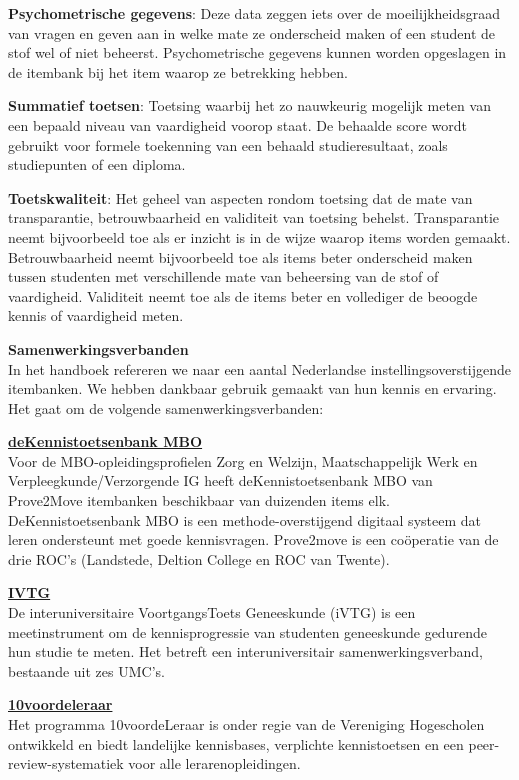 \documentclass[
]{book}
\begin{document}
\textbf{Psychometrische gegevens}: Deze data zeggen iets over de moeilijkheidsgraad van vragen en geven aan in welke mate ze onderscheid maken of een student de stof wel of niet beheerst. Psychometrische gegevens kunnen worden opgeslagen in de itembank bij het item waarop ze betrekking hebben.

\textbf{Summatief toetsen}: Toetsing waarbij het zo nauwkeurig mogelijk meten van een bepaald niveau van vaardigheid voorop staat. De behaalde score wordt gebruikt voor formele toekenning van een behaald studieresultaat, zoals studiepunten of een diploma.

\textbf{Toetskwaliteit}: Het geheel van aspecten rondom toetsing dat de mate van transparantie, betrouwbaarheid en validiteit van toetsing behelst. Transparantie neemt bijvoorbeeld toe als er inzicht is in de wijze waarop items worden gemaakt. Betrouwbaarheid neemt bijvoorbeeld toe als items beter onderscheid maken tussen studenten met verschillende mate van beheersing van de stof of vaardigheid. Validiteit neemt toe als de items beter en vollediger de beoogde kennis of vaardigheid meten.

\textbf{Samenwerkingsverbanden}\\
In het handboek refereren we naar een aantal Nederlandse instellingsoverstijgende itembanken. We hebben dankbaar gebruik gemaakt van hun kennis en ervaring. Het gaat om de volgende samenwerkingsverbanden:

\textbf{\href{https://www.provetomove.nl/dekennistoetsenbank}{deKennistoetsenbank MBO}}\\
Voor de MBO-opleidingsprofielen Zorg en Welzijn, Maatschappelijk Werk en Verpleegkunde/Verzorgende IG heeft deKennistoetsenbank MBO van Prove2Move itembanken beschikbaar van duizenden items elk. DeKennistoetsenbank MBO is een methode-overstijgend digitaal systeem dat leren ondersteunt met goede kennisvragen. Prove2move is een coöperatie van de drie ROC's (Landstede, Deltion College en ROC van Twente).

\textbf{\href{https://www.ivtg.nl}{IVTG}}\\
De interuniversitaire VoortgangsToets Geneeskunde (iVTG) is een meetinstrument om de kennisprogressie van studenten geneeskunde gedurende hun studie te meten. Het betreft een interuniversitair samenwerkingsverband, bestaande uit zes UMC's.

\textbf{\href{https://www.10voordeleraar.nl}{10voordeleraar}}\\
Het programma 10voordeLeraar is onder regie van de Vereniging Hogescholen ontwikkeld en biedt landelijke kennisbases, verplichte kennistoetsen en een peer-review-systematiek voor alle lerarenopleidingen.
\end{document}
